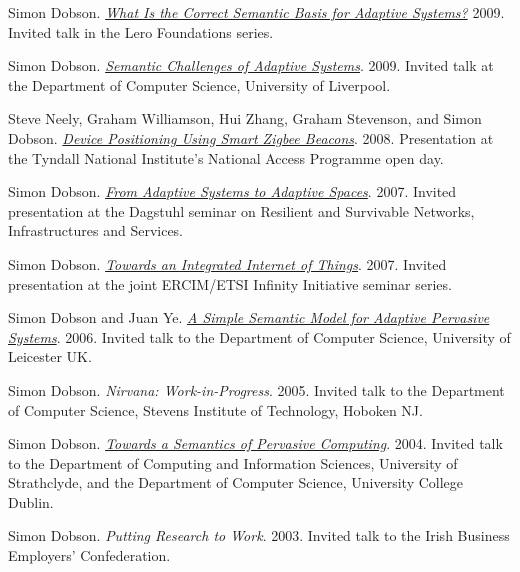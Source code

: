 \documentclass[11pt]{article}
\begin{document}
\label{org00f558f}Simon Dobson.  \emph{\href{https://simondobson.org/softcopy/adaptive-spaces-lero-talk-20090123.pdf}{What Is the Correct Semantic Basis for Adaptive Systems?}} 2009. Invited talk in the Lero Foundations series.

\label{orgb35db91}Simon Dobson.  \emph{\href{https://simondobson.org/softcopy/adaptive-systems-semantics-liverpool-09.pdf}{Semantic Challenges of Adaptive Systems}}. 2009. Invited talk at the Department of Computer Science, University of Liverpool.

\label{org5d2e47b}Steve Neely, Graham Williamson, Hui Zhang, Graham Stevenson, and Simon Dobson.  \emph{\href{https://simondobson.org/softcopy/nap-zigbee-open-day-20080124.pdf}{Device Positioning Using Smart Zigbee Beacons}}. 2008. Presentation at the Tyndall National Institute’s National Access Programme open day.

\label{org44b9c46}Simon Dobson.  \emph{\href{https://simondobson.org/softcopy/resilient-networks-dagstuhl-talk-07.pdf}{From Adaptive Systems to Adaptive Spaces}}. 2007. Invited presentation at the Dagstuhl seminar on Resilient and Survivable Networks, Infrastructures and Services.

\label{orgbda710f}Simon Dobson.  \emph{\href{https://simondobson.org/softcopy/myfile:research/activities/ercim-directorate-06/ercim-etsi-20071129.pdf}{Towards an Integrated Internet of Things}}. 2007. Invited presentation at the joint ERCIM/ETSI Infinity Initiative seminar series.

\label{org12b7f89}Simon Dobson and Juan Ye.  \emph{\href{https://simondobson.org/softcopy/simple-semantic-model-leicester-talk.pdf}{A Simple Semantic Model for Adaptive Pervasive Systems}}. 2006. Invited talk to the Department of Computer Science, University of Leicester UK.

\label{org616c0f1}Simon Dobson.  \emph{Nirvana: Work-in-Progress}. 2005. Invited talk to the Department of Computer Science, Stevens Institute of Technology, Hoboken NJ.

\label{org58782f2}Simon Dobson.  \emph{\href{https://simondobson.org/softcopy/rational-reconstruction-talk.pdf}{Towards a Semantics of Pervasive Computing}}. 2004. Invited talk to the Department of Computing and Information Sciences, University of Strathclyde, and the Department of Computer Science, University College Dublin.

\label{orgd3f58ab}Simon Dobson.  \emph{Putting Research to Work}. 2003. Invited talk to the Irish Business Employers’ Confederation.
\end{document}
